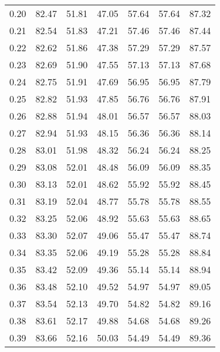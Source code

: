 \begin{tabular}{|c|c|c|c|c|c|c|}
      0.20 &     82.47 &     51.81 &      47.05 &   57.64 &      57.64 &         87.32 \\
      0.21 &     82.54 &     51.83 &      47.21 &   57.46 &      57.46 &         87.44 \\
      0.22 &     82.62 &     51.86 &      47.38 &   57.29 &      57.29 &         87.57 \\
      0.23 &     82.69 &     51.90 &      47.55 &   57.13 &      57.13 &         87.68 \\
      0.24 &     82.75 &     51.91 &      47.69 &   56.95 &      56.95 &         87.79 \\
      0.25 &     82.82 &     51.93 &      47.85 &   56.76 &      56.76 &         87.91 \\
      0.26 &     82.88 &     51.94 &      48.01 &   56.57 &      56.57 &         88.03 \\
      0.27 &     82.94 &     51.93 &      48.15 &   56.36 &      56.36 &         88.14 \\
      0.28 &     83.01 &     51.98 &      48.32 &   56.24 &      56.24 &         88.25 \\
      0.29 &     83.08 &     52.01 &      48.48 &   56.09 &      56.09 &         88.35 \\
      0.30 &     83.13 &     52.01 &      48.62 &   55.92 &      55.92 &         88.45 \\
      0.31 &     83.19 &     52.04 &      48.77 &   55.78 &      55.78 &         88.55 \\
      0.32 &     83.25 &     52.06 &      48.92 &   55.63 &      55.63 &         88.65 \\
      0.33 &     83.30 &     52.07 &      49.06 &   55.47 &      55.47 &         88.74 \\
      0.34 &     83.35 &     52.06 &      49.19 &   55.28 &      55.28 &         88.84 \\
      0.35 &     83.42 &     52.09 &      49.36 &   55.14 &      55.14 &         88.94 \\
      0.36 &     83.48 &     52.10 &      49.52 &   54.97 &      54.97 &         89.05 \\
      0.37 &     83.54 &     52.13 &      49.70 &   54.82 &      54.82 &         89.16 \\
      0.38 &     83.61 &     52.17 &      49.88 &   54.68 &      54.68 &         89.26 \\
      0.39 &     83.66 &     52.16 &      50.03 &   54.49 &      54.49 &         89.36 \\

\end{tabular}
